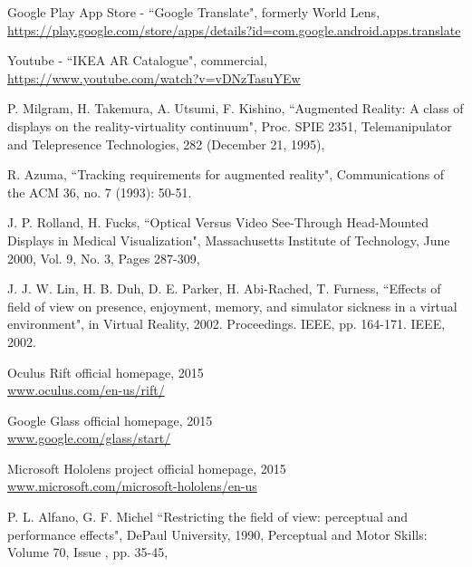 \begin{thebibliography}{99}
Google Play App Store - ``Google Translate", formerly World Lens, \\ \href{https://play.google.com/store/apps/details?id=com.google.android.apps.translate}{https://play.google.com/store/apps/details?id=com.google.android.apps.translate}

Youtube - ``IKEA AR Catalogue", commercial, \\ \href{https://www.youtube.com/watch?v=vDNzTasuYEw}{https://www.youtube.com/watch?v=vDNzTasuYEw}

P. Milgram, H. Takemura, A. Utsumi, F. Kishino,
``Augmented Reality: A class of displays on the reality-virtuality continuum",
Proc. SPIE 2351, Telemanipulator and Telepresence Technologies, 282 (December 21, 1995), 

R. Azuma,
``Tracking requirements for augmented reality", Communications of the ACM 36, no. 7 (1993): 50-51.




J. P. Rolland, H. Fucks,
``Optical Versus Video See-Through Head-Mounted Displays in Medical Visualization",
Massachusetts Institute of Technology, June 2000, Vol. 9, No. 3, Pages 287-309,

J. J. W. Lin, H. B. Duh, D. E. Parker, H. Abi-Rached, T. Furness,
``Effects of field of view on presence, enjoyment, memory, and simulator sickness in a virtual environment", in Virtual Reality, 2002. Proceedings. IEEE, pp. 164-171. IEEE, 2002.

Oculus Rift official homepage, 2015 \\ \href{https://www.oculus.com/en-us/rift/}{www.oculus.com/en-us/rift/}

Google Glass official homepage, 2015 \\ \href{https://www.google.com/glass/start/
}{www.google.com/glass/start/}

Microsoft Hololens project official homepage, 2015 \\ \href{https://www.microsoft.com/microsoft-hololens/en-us}{www.microsoft.com/microsoft-hololens/en-us}

P. L. Alfano, G. F. Michel
``Restricting the field of view: perceptual and performance effects",
DePaul University, 1990, Perceptual and Motor Skills: Volume 70, Issue , pp. 35-45,


\end{thebibliography}
